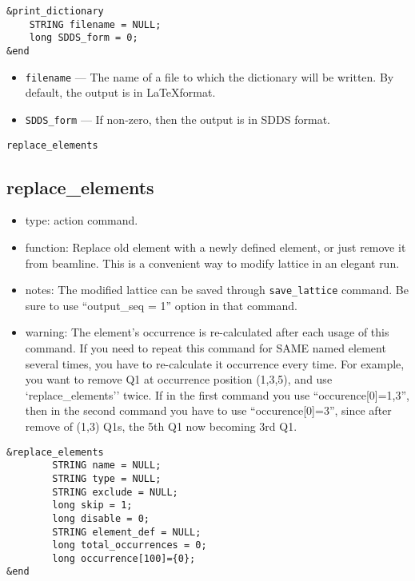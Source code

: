 \documentclass[11pt]{article}
\begin{document}
\begin{verbatim}
&print_dictionary
    STRING filename = NULL;
    long SDDS_form = 0;
&end
\end{verbatim}

\begin{itemize}
\item \verb|filename| --- The name of a file to which the dictionary will be written.  By default, the 
  output is in \LaTeX format.
\item \verb|SDDS_form| --- If non-zero, then the output is in  SDDS format.
\end{itemize}

\begin{latexonly}
\newpage
\begin{center}{\Large\verb|replace_elements|}\end{center}
\end{latexonly}
\subsection{replace\_elements \label{subsec:replaceelements}}

\begin{itemize}
\item type: action command.
\item function: Replace old element with a newly defined element, or just 
   remove it from beamline. This is a convenient way to modify lattice in an elegant run.
\item notes: 
	The modified lattice can be saved through \verb|save_lattice|
   command. Be sure to use ``output\_seq = 1'' option in that command.  
\item warning:
   The element's occurrence is re-calculated after each usage of this command. If 
   you need to repeat this command for SAME named element several times, you have to re-calculate 
   it occurrence every time. For example, you want to remove Q1 at occurrence position 
   (1,3,5), and use 
   `replace\_elements'' twice. If in the first command you use ``occurence[0]=1,3'',
   then in the second command you have to use ``occurence[0]=3'', since after remove of
   (1,3) Q1s, the 5th Q1 now becoming 3rd Q1.
\end{itemize}

\begin{verbatim}
&replace_elements
        STRING name = NULL;
        STRING type = NULL;
        STRING exclude = NULL;
        long skip = 1;
        long disable = 0;
        STRING element_def = NULL;
        long total_occurrences = 0;
        long occurrence[100]={0};
&end
\end{verbatim}
\end{document}

